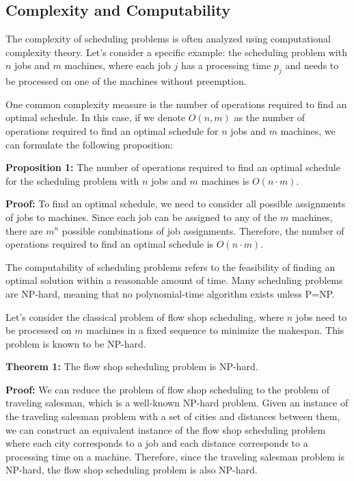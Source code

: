 \documentclass[12pt]{book} %
\begin{document}
\subsection{Complexity and Computability}

The complexity of scheduling problems is often analyzed using computational complexity theory. Let's consider a specific example: the scheduling problem with \(n\) jobs and \(m\) machines, where each job \(j\) has a processing time \(p_j\) and needs to be processed on one of the machines without preemption.

One common complexity measure is the number of operations required to find an optimal schedule. In this case, if we denote \(O(n, m)\) as the number of operations required to find an optimal schedule for \(n\) jobs and \(m\) machines, we can formulate the following proposition:

\textbf{Proposition 1:} The number of operations required to find an optimal schedule for the scheduling problem with \(n\) jobs and \(m\) machines is \(O(n \cdot m)\).

\textbf{Proof:} 
To find an optimal schedule, we need to consider all possible assignments of jobs to machines. Since each job can be assigned to any of the \(m\) machines, there are \(m^n\) possible combinations of job assignments. Therefore, the number of operations required to find an optimal schedule is \(O(n \cdot m)\).

The computability of scheduling problems refers to the feasibility of finding an optimal solution within a reasonable amount of time. Many scheduling problems are NP-hard, meaning that no polynomial-time algorithm exists unless P=NP. 

Let's consider the classical problem of flow shop scheduling, where \(n\) jobs need to be processed on \(m\) machines in a fixed sequence to minimize the makespan. This problem is known to be NP-hard.

\textbf{Theorem 1:} The flow shop scheduling problem is NP-hard.

\textbf{Proof:} 
We can reduce the problem of flow shop scheduling to the problem of traveling salesman, which is a well-known NP-hard problem. Given an instance of the traveling salesman problem with a set of cities and distances between them, we can construct an equivalent instance of the flow shop scheduling problem where each city corresponds to a job and each distance corresponds to a processing time on a machine. Therefore, since the traveling salesman problem is NP-hard, the flow shop scheduling problem is also NP-hard.
\end{document}

